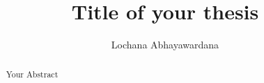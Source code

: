 \documentclass[HSHL, BachelorThesis]{teamhenkler}
\title{Title of your thesis}
\author{Lochana Abhayawardana}
\begin{document}
\maketitle
\begin{abstract}
	Your Abstract
\end{abstract}

\makedeclaration
\maketoc











 

\appendix


\end{document}
